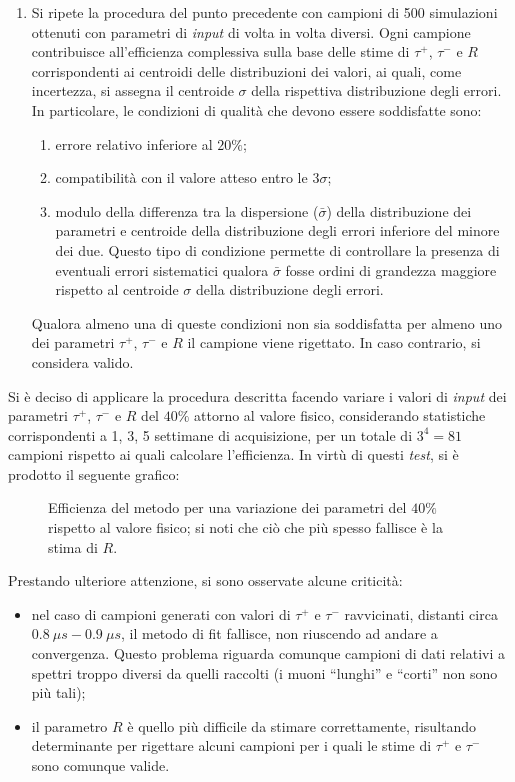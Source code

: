 \documentclass[10pt, oneside, a4paper]{article}   	%
\begin{document}
\begin{enumerate}
 \item Si ripete la procedura del punto precedente con campioni di 500 simulazioni ottenuti con parametri di \textit{input} di volta in volta diversi. Ogni campione contribuisce all'efficienza complessiva sulla base delle stime di $\tau^+$, $\tau^-$ e $R$ corrispondenti ai centroidi delle distribuzioni dei valori, ai quali, come incertezza, si assegna il centroide $\sigma$ della rispettiva distribuzione degli errori. In particolare, le condizioni di qualità che devono essere soddisfatte sono:  
 \begin{enumerate}
  \item errore relativo inferiore al $20\%$;
  \item compatibilità con il valore atteso entro le $3\sigma$;
  \item modulo della differenza tra la dispersione ($\bar{\sigma}$) della distribuzione dei parametri e centroide della distribuzione degli errori inferiore del minore dei due. Questo tipo di condizione permette di controllare la presenza di eventuali errori sistematici qualora $\bar{\sigma}$ fosse ordini di grandezza maggiore rispetto al centroide $\sigma$ della distribuzione degli errori.  
 \end{enumerate}
Qualora almeno una di queste condizioni non sia soddisfatta per almeno uno dei parametri $\tau^+$, $\tau^-$ e $R$ il campione viene rigettato. In caso contrario, si considera valido. 
\end{enumerate}
Si è deciso di applicare la procedura descritta facendo variare i valori di \textit{input} dei parametri $\tau^+$, $\tau^-$ e $R$ del $40\%$ attorno al valore fisico, considerando statistiche corrispondenti a 1, 3, 5 settimane di acquisizione, per un totale di $3^4=81$ campioni rispetto ai quali calcolare l'efficienza. In virtù di questi \textit{test}, si è prodotto il seguente grafico:
%
\begin{figure}[H]
  \centering
  
  \caption{Efficienza del metodo per una variazione dei parametri del $40\%$ rispetto al valore fisico; si noti che ciò che più spesso fallisce è la stima di $R$.}
  \label{fig:finale}
\end{figure}
%
Prestando ulteriore attenzione, si sono osservate alcune criticità:
\begin{itemize}
 \item nel caso di campioni generati con valori di $\tau^+$ e $\tau^-$ ravvicinati, distanti circa $0.8 \ \mu s - 0.9 \ \mu s$, il metodo di fit fallisce, non riuscendo ad andare a convergenza. Questo problema riguarda comunque campioni di dati relativi a spettri troppo diversi da quelli raccolti (i muoni ``lunghi'' e ``corti'' non sono più tali);
 \item il parametro $R$ è quello più difficile da stimare correttamente, risultando determinante per rigettare alcuni campioni per i quali le stime di $\tau^+$ e $\tau^-$ sono comunque valide.  
\end{itemize}
\end{document}

